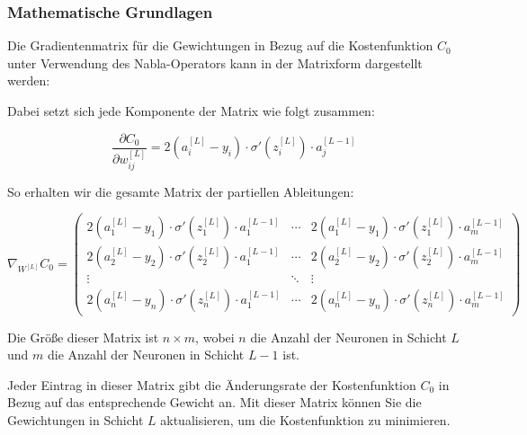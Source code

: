 \subsubsection{Mathematische Grundlagen}

Die Gradientenmatrix für die Gewichtungen in Bezug auf die Kostenfunktion \( C_0 \) unter Verwendung des Nabla-Operators kann in der Matrixform dargestellt werden:

Dabei setzt sich jede Komponente der Matrix wie folgt zusammen:

\[
\frac{\partial C_0}{\partial w_{ij}^{[L]}} = 2(a_i^{[L]} - y_i) \cdot \sigma' (z_i^{[L]}) \cdot a_j^{[L-1]}
\]

So erhalten wir die gesamte Matrix der partiellen Ableitungen:

\[
\nabla_{W^{[L]}} C_0 = 
\begin{pmatrix}
2(a_1^{[L]} - y_1) \cdot \sigma' (z_1^{[L]}) \cdot a_1^{[L-1]} & \cdots & 2(a_1^{[L]} - y_1) \cdot \sigma' (z_1^{[L]}) \cdot a_m^{[L-1]} \\
2(a_2^{[L]} - y_2) \cdot \sigma' (z_2^{[L]}) \cdot a_1^{[L-1]} & \cdots & 2(a_2^{[L]} - y_2) \cdot \sigma' (z_2^{[L]}) \cdot a_m^{[L-1]} \\
\vdots & \ddots & \vdots \\
2(a_n^{[L]} - y_n) \cdot \sigma' (z_n^{[L]}) \cdot a_1^{[L-1]} & \cdots & 2(a_n^{[L]} - y_n) \cdot \sigma' (z_n^{[L]}) \cdot a_m^{[L-1]}
\end{pmatrix}
\]

Die Größe dieser Matrix ist \( n \times m \), wobei \( n \) die Anzahl der Neuronen in Schicht \( L \) und \( m \) die Anzahl der Neuronen in Schicht \( L-1 \) ist.

Jeder Eintrag in dieser Matrix gibt die Änderungsrate der Kostenfunktion \( C_0 \) in Bezug auf das entsprechende Gewicht an. Mit dieser Matrix können Sie die Gewichtungen in Schicht \( L \) aktualisieren, um die Kostenfunktion zu minimieren.
